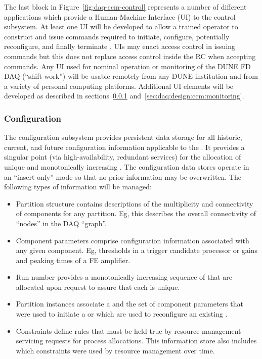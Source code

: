 The last block in Figure~\ref{fig:daq-ccm-control} represents a number of different applications which provide a Human-Machine Interface (UI) to the control subsystem.
At least one UI will be developed to allow a trained operator to construct and issue commands required to initiate, configure, potentially reconfigure, and finally terminate . 
UIs may enact access control in issuing commands but this does not replace access control inside the RC when accepting commands.
Any UI used for nominal operation or monitoring of the DUNE FD DAQ (``shift work'') will be usable remotely from any DUNE institution and from a variety of personal computing platforms.  
Additional UI elements will be developed as described in sections~\ref{sec:daq:design:ccm:configuration} and~\ref{sec:daq:design:ccm:monitoring}.


\subsubsection{Configuration}
\label{sec:daq:design:ccm:configuration}

The  configuration subsystem provides persistent data storage for all historic, current, and future configuration information applicable to the .
It provides a singular point (via high-availability, redundant services) for the allocation of unique and monotonically increasing .
The configuration data stores operate in an ``insert-only'' mode so that no prior information may be overwritten. 
The following types of information will be managed:

\begin{itemize}

\item Partition structure contains descriptions of the multiplicity and connectivity of  components for any partition.   Eg, this describes the overall connectivity of ``nodes'' in the DAQ ``graph''.

\item Component parameters comprise configuration information associated with any given  component.  Eg, thresholds in a trigger candidate processor or gains and peaking times of a FE amplifier.

\item Run number provides a monotonically increasing sequence of  that are allocated upon request to assure that each is unique.

\item Partition instances associate a  and the set of component parameters that were used to initiate a  or which are used to reconfigure an existing .  

\item Constraints define rules that must be held true by resource management servicing requests for process allocations.  This information store also includes which constraints were used by resource management over time.
\end{itemize}


